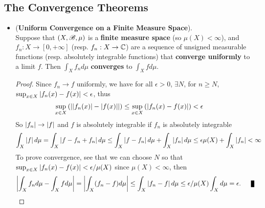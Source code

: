 \documentclass[11pt]{article}
\begin{document}
\subsection{The Convergence Theorems}
\begin{itemize}
\item \begin{proposition} (\textbf{Uniform Convergence on a Finite Measure Space}). \citep{tao2011introduction}\\
Suppose that $(X, {\mathscr B}, \mu)$ is a \textbf{finite measure space} (so $\mu(X) < \infty$), and $f_n: X \rightarrow [0, +\infty]$ (resp. $f_n: X \rightarrow {\mathbb C}$) are a sequence of unsigned measurable functions (resp. absolutely integrable functions) that \textbf{converge uniformly} to a limit $f$. Then $\int_X f_n d\mu$ \textbf{converges} to $\int_X f d\mu$.
\end{proposition}
\begin{proof}
Since $f_n \rightarrow f$ uniformly, we have for all $\epsilon >0$, $\exists N$, for $n \ge  N$, $\sup_{x \in X}\left\lvert f_n(x) - f(x) \right\rvert < \epsilon$, thus
\begin{align*}
\sup_{x\in X}\left(\left\lvert \left\lvert f_n(x) \right\rvert - \left\lvert f(x) \right\rvert \right\rvert\right) &\le \sup_{x \in X}\left(\left\lvert f_n(x) - f(x) \right\rvert\right) < \epsilon
\end{align*} So $\left\lvert f_n \right\rvert \rightarrow \left\lvert f \right\rvert$ and $f$ is absolutely integrable if $f_n$ is absolutely integrable
\begin{align*}
\int_{X} \left\lvert f \right\rvert d\mu = \int_{X} \left\lvert f - f_n + f_n \right\rvert d\mu \le \int_{X} \left\lvert f - f_n \right\rvert d\mu + \int_{X} \left\lvert f_n \right\rvert d\mu \le \epsilon \mu(X) +  \int_{X} \left\lvert f_n \right\rvert < \infty
\end{align*} To prove convergence, see that we can choose $N$ so that $\sup_{x \in X}\left\lvert f_n(x) - f(x) \right\rvert < \epsilon / \mu(X)$ since $\mu(X) < \infty$, then 
\begin{align*}
\abs{\int_X f_n d\mu - \int_X f d\mu} = \abs{\int_X (f_n - f) d\mu} &\le \int_X\abs{f_n - f} d\mu \le  \epsilon / \mu(X) \int_X d\mu = \epsilon. \qed
\end{align*}
\end{proof}



\end{itemize}
\end{document}
